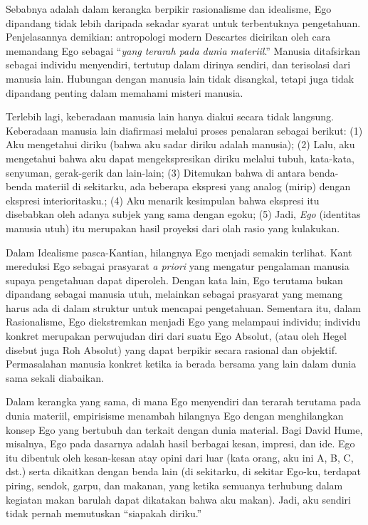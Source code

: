 \documentclass[10pt,a4paper]{article}
\begin{document}
\begin{multicols}{2}
Sebabnya adalah dalam kerangka berpikir rasionalisme dan idealisme, Ego
dipandang tidak lebih daripada sekadar syarat untuk terbentuknya
pengetahuan. Penjelasannya demikian: antropologi modern Descartes
dicirikan oleh cara memandang Ego sebagai ``\emph{yang terarah pada
dunia materiil}.'' Manusia ditafsirkan sebagai individu menyendiri,
tertutup dalam dirinya sendiri, dan terisolasi dari manusia lain.
Hubungan dengan manusia lain tidak disangkal, tetapi juga tidak
dipandang penting dalam memahami misteri manusia.

Terlebih lagi, keberadaan manusia lain hanya diakui secara tidak
langsung. Keberadaan manusia lain diafirmasi melalui proses penalaran
sebagai berikut: (1) Aku mengetahui diriku (bahwa aku sadar diriku
adalah manusia); (2) Lalu, aku mengetahui bahwa aku dapat
mengekspresikan diriku melalui tubuh, kata-kata, senyuman, gerak-gerik
dan lain-lain; (3) Ditemukan bahwa di antara benda-benda materiil di
sekitarku, ada beberapa ekspresi yang analog (mirip) dengan ekspresi
interioritasku.; (4) Aku menarik kesimpulan bahwa ekspresi itu
disebabkan oleh adanya subjek yang sama dengan egoku; (5) Jadi,
\emph{Ego} (identitas manusia utuh) itu merupakan hasil proyeksi dari
olah rasio yang kulakukan.

Dalam Idealisme pasca-Kantian, hilangnya Ego menjadi semakin terlihat.
Kant mereduksi Ego sebagai prasyarat \emph{a priori} yang mengatur
pengalaman manusia supaya pengetahuan dapat diperoleh. Dengan kata lain,
Ego terutama bukan dipandang sebagai manusia utuh, melainkan sebagai
prasyarat yang memang harus ada di dalam struktur untuk mencapai
pengetahuan. Sementara itu, dalam Rasionalisme, Ego diekstremkan menjadi
Ego yang melampaui individu; individu konkret merupakan perwujudan diri
dari suatu Ego Absolut, (atau oleh Hegel disebut juga Roh Absolut) yang
dapat berpikir secara rasional dan objektif. Permasalahan manusia
konkret ketika ia berada bersama yang lain dalam dunia sama sekali
diabaikan.

Dalam kerangka yang sama, di mana Ego menyendiri dan terarah terutama
pada dunia materiil, empirisisme menambah hilangnya Ego dengan
menghilangkan konsep Ego yang bertubuh dan terkait dengan dunia
material. Bagi David Hume, misalnya, Ego pada dasarnya adalah hasil
berbagai kesan, impresi, dan ide. Ego itu dibentuk oleh kesan-kesan atay
opini dari luar (kata orang, aku ini A, B, C, dst.) serta dikaitkan
dengan benda lain (di sekitarku, di sekitar Ego-ku, terdapat piring,
sendok, garpu, dan makanan, yang ketika semuanya terhubung dalam
kegiatan makan barulah dapat dikatakan bahwa aku makan). Jadi, aku
sendiri tidak pernah memutuskan ``siapakah diriku.''


\end{multicols}
\end{document}
